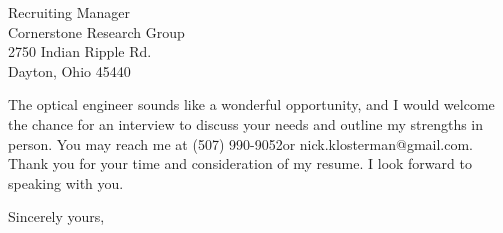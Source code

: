 \documentclass{letter} %
\makeatletter
\newcommand{\contactperson}{Recruiting Manager}
\newcommand{\contactCompany}{Cornerstone Research Group}
\newcommand{\contactStreetAddress}{2750 Indian Ripple Rd.}
\newcommand{\contactCityStateZip}{Dayton, Ohio 45440 }
\newcommand{\position}{optical engineer }%
\newcommand{\personalphonenumber}{(507) 990-9052}
\newcommand{\personalemail}{nick.klosterman@gmail.com}
\makeatother
\begin{document}
\begin{letter}{\contactperson \\
\contactCompany \\
\contactStreetAddress \\
\contactCityStateZip

}
 
\noindent 
The \position sounds like a wonderful opportunity, and I would welcome the chance for an interview to discuss your needs and outline my strengths in person. 
You may reach me at \personalphonenumber or \personalemail.
Thank you for your time and consideration of my resume. I look forward to speaking with you.
 

\closing{Sincerely yours,} 
 

 

\end{letter}
 
\end{document}
